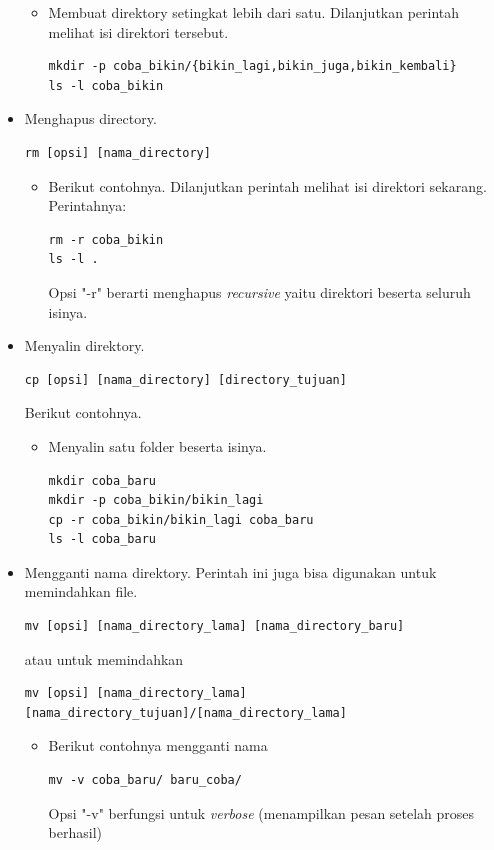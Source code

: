 \documentclass[12pt,]{article}
\begin{document}
\begin{itemize}
\begin{itemize}
			\item Membuat direktory setingkat lebih dari satu.
			Dilanjutkan perintah melihat isi direktori tersebut.
			\begin{verbatim}
mkdir -p coba_bikin/{bikin_lagi,bikin_juga,bikin_kembali}
ls -l coba_bikin
			\end{verbatim}
		\end{itemize}

		\item Menghapus directory.
		\begin{verbatim}
rm [opsi] [nama_directory]
		\end{verbatim}
		\begin{itemize}
			\item Berikut contohnya.
			Dilanjutkan perintah melihat isi direktori sekarang.
			Perintahnya:
			\begin{verbatim}
rm -r coba_bikin
ls -l .
			\end{verbatim}
			Opsi "-r" berarti menghapus \textit{recursive} yaitu direktori beserta seluruh isinya.
		\end{itemize}


		\item Menyalin direktory.
		\begin{verbatim}
cp [opsi] [nama_directory] [directory_tujuan]
		\end{verbatim}
		Berikut contohnya.
		\begin{itemize}
			\item Menyalin satu folder beserta isinya.
			\begin{verbatim}
mkdir coba_baru
mkdir -p coba_bikin/bikin_lagi
cp -r coba_bikin/bikin_lagi coba_baru
ls -l coba_baru
			\end{verbatim}
		\end{itemize}

		\item Mengganti nama direktory.
		Perintah ini juga bisa digunakan untuk memindahkan file.
		\begin{verbatim}
mv [opsi] [nama_directory_lama] [nama_directory_baru]
		\end{verbatim}
		atau untuk memindahkan
		\begin{verbatim}
mv [opsi] [nama_directory_lama] [nama_directory_tujuan]/[nama_directory_lama]
		\end{verbatim}
		\begin{itemize}
			\item Berikut contohnya mengganti nama
			\begin{verbatim}
mv -v coba_baru/ baru_coba/
			\end{verbatim}
			Opsi "-v" berfungsi untuk \textit{verbose} (menampilkan pesan setelah proses berhasil)


\end{itemize}
\end{itemize}
\end{document}
